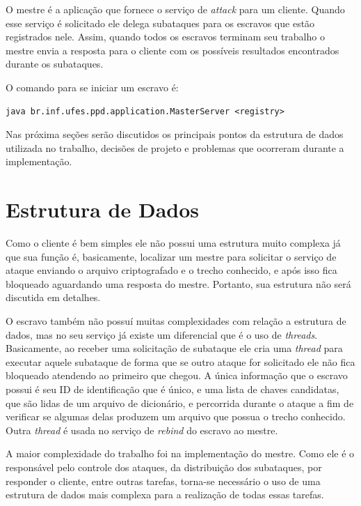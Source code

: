 \documentclass[
	12pt,				%
    oneside,			%
	a4paper,			%
	english,			%
	brazil,				%
	]{abntex2}
\begin{document}
O mestre é a aplicação que fornece o serviço de \textit{attack} para um cliente. Quando esse serviço é solicitado
ele delega subataques para os escravos que estão registrados nele. Assim, quando todos os escravos terminam seu trabalho o 
mestre envia a resposta para o cliente com os possíveis resultados encontrados durante os subataques.

O comando para se iniciar um escravo é:

\begin{lstlisting}
java br.inf.ufes.ppd.application.MasterServer <registry>\end{lstlisting}


Nas próxima seções serão discutidos os principais pontos da estrutura de dados utilizada no trabalho, decisões de projeto e 
problemas que ocorreram durante a implementação.

\section{Estrutura de Dados}

Como o cliente é bem simples ele não possui uma estrutura muito complexa já que sua função é, basicamente, localizar um mestre para solicitar o serviço de ataque enviando o arquivo criptografado e o trecho conhecido, e após isso fica bloqueado aguardando uma resposta do mestre. Portanto, sua estrutura não será discutida em detalhes.

O escravo também não possuí muitas complexidades com relação a estrutura de dados, mas no seu serviço já existe um 
diferencial que é o uso de \textit{threads}. Basicamente, ao receber uma solicitação de subataque ele cria uma \textit{thread} para executar aquele subataque de forma que se outro ataque for solicitado ele não fica bloqueado atendendo ao primeiro que chegou.
A única informação que o escravo possui é seu ID de identificação que é único, e uma lista de chaves candidatas, que são lidas de um arquivo de dicionário, e percorrida durante o ataque a fim de verificar se algumas delas produzem um arquivo que possua o trecho conhecido. Outra \textit{thread} é usada no serviço de \textit{rebind} do escravo ao mestre.

A maior complexidade do trabalho foi na implementação do mestre. Como ele é o responsável pelo controle dos ataques, 
da distribuição dos subataques, por responder o cliente, entre outras tarefas, torna-se necessário o uso de uma estrutura 
de dados mais complexa para a realização de todas essas tarefas.
\end{document}
